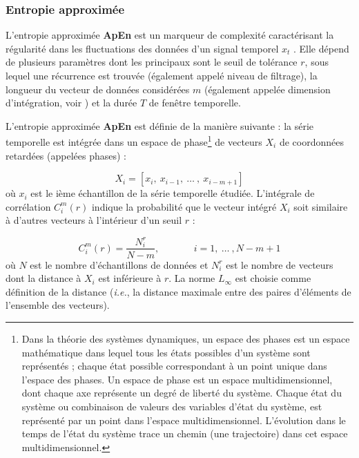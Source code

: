 \subsubsection*{Entropie approximée}

L'entropie approximée \textbf{ApEn} est un marqueur de complexité caractérisant la régularité dans les fluctuations des données d'un signal temporel $x_t$ \citep{pincus1991regularity, pincus1991approximate}. 
Elle dépend de plusieurs paramètres dont les principaux sont le seuil de tolérance $r$, sous lequel une récurrence est trouvée (également appelé niveau de filtrage), la longueur du vecteur de données considérées $m$ (également appelée dimension d'intégration, voir \cite{kantz2004nonlinear}) et la durée $T$ de fenêtre temporelle.

L'entropie approximée \textbf{ApEn} est définie de la manière suivante : la série temporelle est intégrée dans un espace de phase\footnote{Dans la théorie des systèmes dynamiques, un espace des phases est un espace mathématique dans lequel tous les états possibles d'un système sont représentés ; chaque état possible correspondant à un point unique dans l'espace des phases. Un espace de phase est un espace multidimensionnel, dont chaque axe représente un degré de liberté du système. Chaque état du système ou combinaison de valeurs des variables d'état du système, est représenté par un point dans l'espace multidimensionnel. L'évolution dans le temps de l'état du système trace un chemin (une trajectoire) dans cet espace multidimensionnel.} de vecteurs $X_i$ de coordonnées retardées (appelées phases) :

\begin{equation}
X_i = [x_i,~x_{i-1},~\ldots~,~x_{i-m+1}]
\end{equation}
où $x_i$ est le ième échantillon de la série temporelle étudiée. 
L'intégrale de corrélation $C_i^m(r)$ indique la probabilité que le vecteur intégré $X_i$  soit similaire à d'autres vecteurs à l'intérieur d'un seuil $r$ : 

\begin{equation}
C_i^m(r) = \frac{N_i^r}{N-m},~~~~~~~~~~~~~~~~i=1,~\ldots~,N-m+1
 \end{equation}
où $N$ est le nombre d'échantillons de données et $N_i^r$ est le nombre de vecteurs dont la distance à $X_i$ est inférieure à $r$. 
La norme $L_\infty$ est choisie comme définition de la distance (\textit{i.e.}, la distance maximale entre des paires d'éléments de l'ensemble des vecteurs). 

